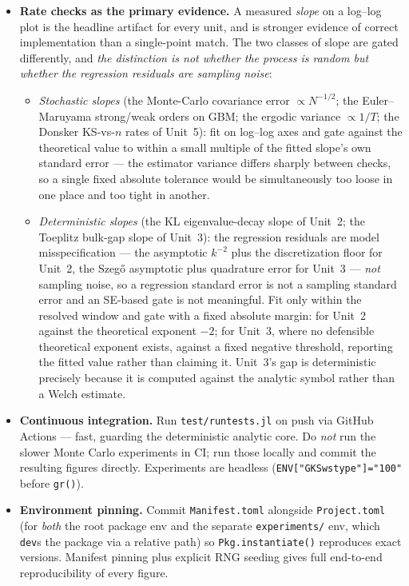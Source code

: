 \documentclass[11pt]{article}
\begin{document}
\begin{itemize}[leftmargin=1.4cm]
  not discriminate a one-sided implementation).
  \item \textbf{Rate checks as the primary evidence.} A measured \emph{slope} on a log--log plot is
  the headline artifact for every unit, and is stronger evidence of correct implementation than a
  single-point match. The two classes of slope are gated differently, and \emph{the distinction is not
  whether the process is random but whether the regression residuals are sampling noise}:
  \begin{itemize}[leftmargin=1.0cm]
    \item \emph{Stochastic slopes} (the Monte-Carlo covariance error $\propto N^{-1/2}$; the
    Euler--Maruyama strong/weak orders on GBM; the ergodic variance $\propto 1/T$; the Donsker
    KS-vs-$n$ rates of Unit~5): fit on log--log axes and gate against the theoretical value to within a
    small multiple of the fitted slope's own standard error --- the estimator variance differs sharply
    between checks, so a single fixed absolute tolerance would be simultaneously too loose in one place
    and too tight in another.
    \item \emph{Deterministic slopes} (the KL eigenvalue-decay slope of Unit~2; the Toeplitz bulk-gap
    slope of Unit~3): the regression residuals are model misspecification --- the asymptotic $k^{-2}$
    plus the discretization floor for Unit~2, the Szeg\H{o} asymptotic plus quadrature error for
    Unit~3 --- \emph{not} sampling noise, so a regression standard error is not a sampling standard
    error and an SE-based gate is not meaningful. Fit only within the resolved window and gate with a
    fixed absolute margin: for Unit~2 against the theoretical exponent $-2$; for Unit~3, where no
    defensible theoretical exponent exists, against a fixed negative threshold, reporting the fitted
    value rather than claiming it. Unit~3's gap is deterministic precisely because it is computed
    against the analytic symbol rather than a Welch estimate.
  \end{itemize}
  \item \textbf{Continuous integration.} Run \texttt{test/runtests.jl} on push via GitHub Actions ---
  fast, guarding the deterministic analytic core. Do \emph{not} run the slower Monte Carlo experiments
  in CI; run those locally and commit the resulting figures directly. Experiments are headless
  (\texttt{ENV["GKSwstype"]="100"} before \texttt{gr()}).
  \item \textbf{Environment pinning.} Commit \texttt{Manifest.toml} alongside \texttt{Project.toml}
  (for \emph{both} the root package env and the separate \texttt{experiments/} env, which \texttt{dev}s
  the package via a relative path) so \texttt{Pkg.instantiate()} reproduces exact versions. Manifest
  pinning plus explicit RNG seeding gives full end-to-end reproducibility of every figure.
\end{itemize}
\end{document}
